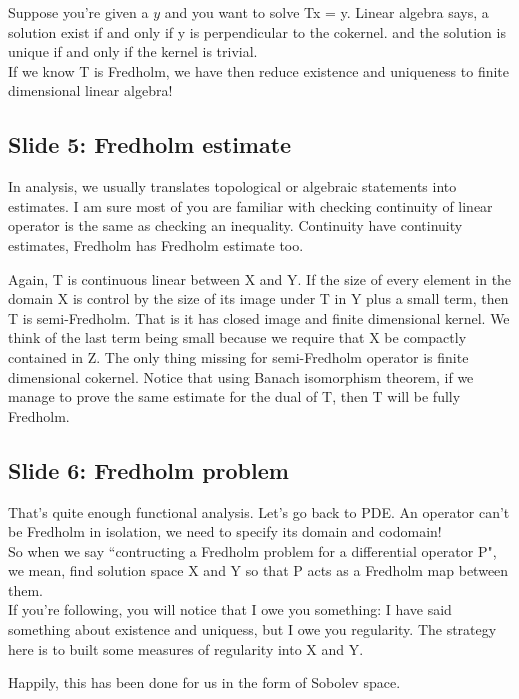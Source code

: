 \documentclass{article}
\begin{document}
Suppose you're given a $y$ and you want to solve Tx = y. Linear algebra says, a solution exist if and only if y is perpendicular to the cokernel. and the solution is unique if and only if the kernel is trivial. \\

If we know T is Fredholm, we have then reduce existence and uniqueness to finite dimensional linear algebra! 


\subsection{Slide 5: Fredholm estimate}
In analysis, we usually translates topological or algebraic statements into estimates. I am sure most of you are familiar with checking continuity of linear operator is the same as checking an inequality.  Continuity have continuity estimates, Fredholm has Fredholm estimate too. 

Again, T is continuous linear between X and Y. If the size of every element in the domain X is control by the size of its image under T in Y plus a small term, then T is semi-Fredholm. That is it has closed image and finite dimensional kernel. 
We think of the last term being small because we require that X be compactly contained in Z. The only thing missing for semi-Fredholm operator is finite dimensional cokernel. Notice that using Banach isomorphism theorem, if we manage to prove the same estimate for the dual of T, then T will be fully Fredholm. 

\subsection{Slide 6: Fredholm problem}
That's quite enough functional analysis. Let's go back to PDE. An operator can't be Fredholm in isolation, we need to specify its domain and codomain!\\

So when we say ``contructing a Fredholm problem for a differential operator P", we mean, find solution space X and Y so that P acts as a Fredholm map between them. \\

If you're following, you will notice that I owe you something: I have said something about existence and uniquess, but I owe you regularity. The strategy here is to built some measures of regularity into X and Y. 

Happily, this has been done for us in the form of Sobolev space. 
\end{document}

